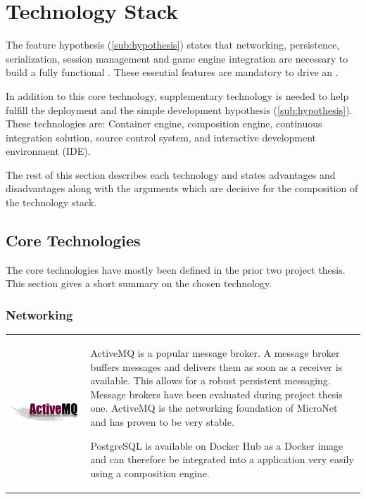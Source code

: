 \section{Technology Stack}

The feature hypothesis (\autoref{sub:hypothesis}) states that networking,
persistence, serialization, session management and game engine integration are
necessary to build a fully functional \og{}. These essential features are
mandatory to drive an \og{}.

In addition to this core technology, supplementary technology is needed to help
fulfill the deployment and the simple development hypothesis
(\autoref{sub:hypothesis}). These technologies are: Container engine,
composition engine, continuous integration solution, source control system, and
interactive development environment (IDE).

The rest of this section describes each technology and states advantages and
disadvantages along with the arguments which are decisive for the composition
of the technology stack.

\subsection{Core Technologies}

The core technologies have mostly been defined in the prior two project thesis.
This section gives a short summary on the chosen technology.

\subsubsection{Networking}

\begin{table}[h!]
  \centering
  \begin{tabular}{ c m{9cm} }
    \begin{minipage}{.3\textwidth}
      \includegraphics[width=\linewidth]{images/dependencies/activemq}
    \end{minipage}& 
    ActiveMQ is a popular message broker. A message broker buffers messages
    and delivers them as soon as a receiver is available. This allows for a
    robust persistent messaging. Message brokers have been evaluated during
    project thesis one. ActiveMQ is the networking foundation of MicroNet and
    has proven to be very stable.
    
    PostgreSQL is available on Docker Hub as a Docker image and can therefore
	be integrated into a \ms{} application very easily using a composition engine.
  \end{tabular}
\end{table}
\FloatBarrier
\newpage

